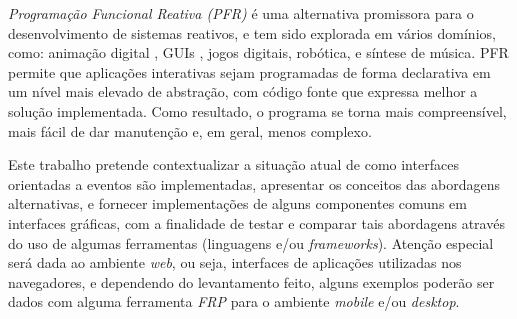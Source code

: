\emph{Programação Funcional Reativa (PFR)} é uma alternativa promissora para o
desenvolvimento de sistemas reativos, e tem sido explorada em vários domínios,
como: animação digital \cite{Elliott-H:1997:Fran}, GUIs \cite{Czaplicki:2012:Elm},
jogos digitais, robótica, e síntese de música.
PFR permite que aplicações interativas sejam programadas de forma declarativa
em um nível mais elevado de abstração, com código fonte que expressa melhor a
solução implementada.
Como resultado, o programa se torna mais compreensível, mais fácil de dar
manutenção e, em geral, menos complexo.

Este trabalho pretende contextualizar a situação atual
de como interfaces orientadas a eventos são implementadas,
apresentar os conceitos das abordagens alternativas, e
fornecer implementações de alguns componentes comuns em
interfaces gráficas, com a finalidade de testar e comparar
tais abordagens através do uso de algumas ferramentas
(linguagens e/ou \emph{frameworks}). Atenção especial será
dada ao ambiente \emph{web}, ou seja, interfaces de
aplicações utilizadas nos navegadores, e dependendo do
levantamento feito, alguns exemplos poderão ser dados
com alguma ferramenta \emph{FRP} para o ambiente
\emph{mobile} e/ou \emph{desktop}.

